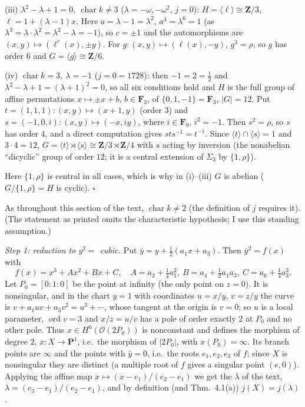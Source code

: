 \documentclass[11pt]{article}
\begin{document}
(iii) \emph{$\lambda^2-\lambda+1=0$, $\operatorname{char}k\ne3$} ($\lambda=-\omega,-\omega^2$, $j=0$): $H=\langle\ell\rangle\cong\mathbf Z/3$, $\ell=1+(\lambda-1)x$. Here $a=\lambda-1=\lambda^2$, $a^3=\lambda^6=1$ (as $\lambda^3=\lambda\cdot\lambda^2=\lambda^2-\lambda=-1$), so $c=\pm1$ and the automorphisms are $(x,y)\mapsto(\ell^r(x),\pm y)$. For $g:(x,y)\mapsto(\ell(x),-y)$, $g^3=\rho$, so $g$ has order $6$ and $G=\langle g\rangle\cong\mathbf Z/6$.

(iv) \emph{$\operatorname{char}k=3$, $\lambda=-1$} ($j=0=1728$): then $-1=2=\tfrac12$ and $\lambda^2-\lambda+1=(\lambda+1)^2=0$, so all six conditions hold and $H$ is the full group of affine permutations $x\mapsto\pm x+b$, $b\in\mathbf F_3$, of $\{0,1,-1\}=\mathbf F_3$, $|G|=12$. Put $t=(1,1,1):(x,y)\mapsto(x+1,y)$ (order $3$) and $s=(-1,0,i):(x,y)\mapsto(-x,iy)$, where $i\in\mathbf F_9$, $i^2=-1$. Then $s^2=\rho$, so $s$ has order $4$, and a direct computation gives $sts^{-1}=t^{-1}$. Since $\langle t\rangle\cap\langle s\rangle=1$ and $3\cdot4=12$, $G=\langle t\rangle\rtimes\langle s\rangle\cong\mathbf Z/3\rtimes\mathbf Z/4$ with $s$ acting by inversion (the nonabelian ``dicyclic'' group of order $12$; it is a central extension of $\Sigma_3$ by $\{1,\rho\}$).

Here $\{1,\rho\}$ is central in all cases, which is why in (i)--(iii) $G$ is abelian ($G/\{1,\rho\}=H$ is cyclic). \hfill$\square$

\pf
As throughout this section of the text, $\operatorname{char}k\ne2$ (the definition of $j$ requires it). (The statement as printed omits the characteristic hypothesis; I use this standing assumption.)

\emph{Step 1: reduction to $y^2=$ cubic.} Put $\bar y=y+\tfrac12(a_1x+a_3)$. Then $\bar y^2=f(x)$ with
\[ f(x)=x^3+Ax^2+Bx+C,\quad A=a_2+\tfrac14a_1^2,\ B=a_4+\tfrac12a_1a_3,\ C=a_6+\tfrac14a_3^2. \]
Let $P_0=[0:1:0]$ be the point at infinity (the only point on $z=0$). It is nonsingular, and in the chart $y=1$ with coordinates $u=x/y$, $v=z/y$ the curve is $v+a_1uv+a_3v^2=u^3+\cdots$, whose tangent at the origin is $v=0$; so $u$ is a local parameter, $\operatorname{ord}v=3$ and $x/z=u/v$ has a pole of order exactly $2$ at $P_0$ and no other pole. Thus $x\in H^0(\mathcal O(2P_0))$ is nonconstant and defines the morphism of degree $2$, $x:X\to\mathbf P^1$, i.e.\ the morphism of $|2P_0|$, with $x(P_0)=\infty$. Its branch points are $\infty$ and the points with $\bar y=0$, i.e.\ the roots $e_1,e_2,e_3$ of $f$; since $X$ is nonsingular they are distinct (a multiple root of $f$ gives a singular point $(e,0)$). Applying the affine map $x\mapsto(x-e_1)/(e_2-e_1)$ we get the $\lambda$ of the text, $\lambda=(e_3-e_1)/(e_2-e_1)$, and by definition (and Thm.~4.1(a)) $j(X)=j(\lambda)$.
\end{document}
